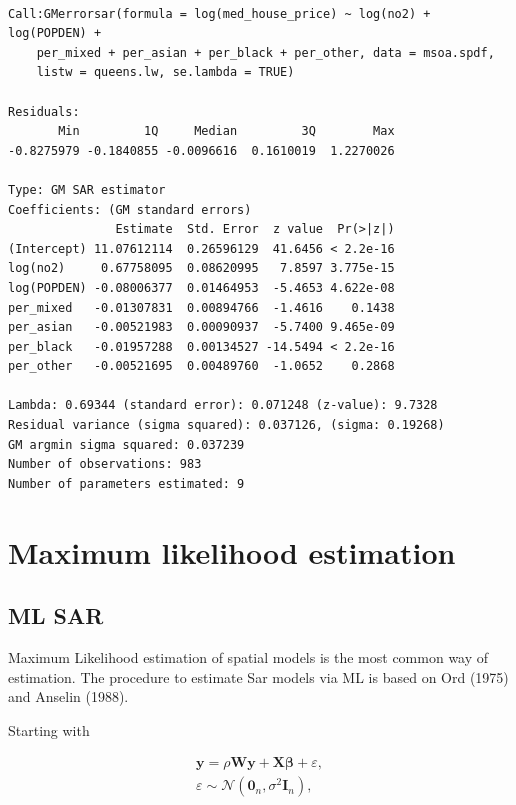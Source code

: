 \documentclass[
  letterpaper,
  DIV=11,
  numbers=noendperiod]{scrreprt}
\begin{document}
\begin{verbatim}

Call:GMerrorsar(formula = log(med_house_price) ~ log(no2) + log(POPDEN) + 
    per_mixed + per_asian + per_black + per_other, data = msoa.spdf, 
    listw = queens.lw, se.lambda = TRUE)

Residuals:
       Min         1Q     Median         3Q        Max 
-0.8275979 -0.1840855 -0.0096616  0.1610019  1.2270026 

Type: GM SAR estimator
Coefficients: (GM standard errors) 
               Estimate  Std. Error  z value  Pr(>|z|)
(Intercept) 11.07612114  0.26596129  41.6456 < 2.2e-16
log(no2)     0.67758095  0.08620995   7.8597 3.775e-15
log(POPDEN) -0.08006377  0.01464953  -5.4653 4.622e-08
per_mixed   -0.01307831  0.00894766  -1.4616    0.1438
per_asian   -0.00521983  0.00090937  -5.7400 9.465e-09
per_black   -0.01957288  0.00134527 -14.5494 < 2.2e-16
per_other   -0.00521695  0.00489760  -1.0652    0.2868

Lambda: 0.69344 (standard error): 0.071248 (z-value): 9.7328
Residual variance (sigma squared): 0.037126, (sigma: 0.19268)
GM argmin sigma squared: 0.037239
Number of observations: 983 
Number of parameters estimated: 9 
\end{verbatim}

\hypertarget{maximum-likelihood-estimation}{%
\section{Maximum likelihood
estimation}\label{maximum-likelihood-estimation}}

\hypertarget{ml-sar}{%
\subsection{ML SAR}\label{ml-sar}}

Maximum Likelihood estimation of spatial models is the most common way
of estimation. The procedure to estimate Sar models via ML is based on
Ord (1975) and Anselin (1988).

Starting with

\[
\begin{split}
    \boldsymbol{\mathbf{y}}  = \rho \boldsymbol{\mathbf{W}}\boldsymbol{\mathbf{y}} + \boldsymbol{\mathbf{X}}\boldsymbol{\mathbf{\beta }}+ \varepsilon, \\
     \varepsilon  \sim \mathcal{N}(\boldsymbol{\mathbf{0}}_n , \sigma^2\boldsymbol{\mathbf{I}}_n),
\end{split}     
\]
\end{document}
